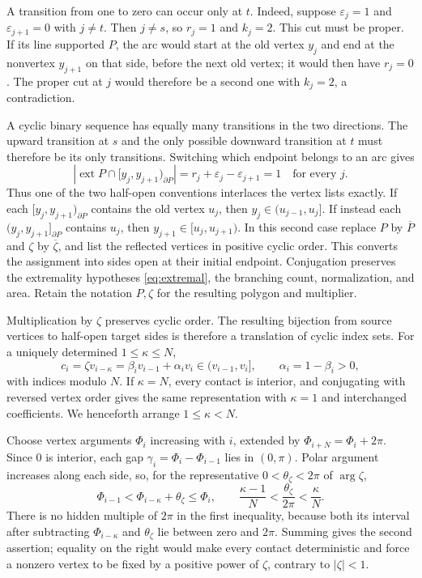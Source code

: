 \documentclass[11pt,a4paper]{article}
\DeclareMathOperator{\ext}{ext}
\theoremstyle{definition}
\theoremstyle{remark}
\numberwithin{equation}{section}
\begin{document}
A transition from one to zero can occur only at $t$. Indeed, suppose $\varepsilon_j=1$ and $\varepsilon_{j+1}=0$ with $j\ne t$. Then $j\ne s$, so $r_j=1$ and $k_j=2$. This cut must be proper. If its line supported $P$, the arc would start at the old vertex $y_j$ and end at the nonvertex $y_{j+1}$ on that side, before the next old vertex; it would then have $r_j=0$. The proper cut at $j$ would therefore be a second one with $k_j=2$, a contradiction.

A cyclic binary sequence has equally many transitions in the two directions. The upward transition at $s$ and the only possible downward transition at $t$ must therefore be its only transitions. Switching which endpoint belongs to an arc gives
\[
 |\ext P\cap[y_j,y_{j+1})_{\partial P}|
 =r_j+\varepsilon_j-\varepsilon_{j+1}=1
 \quad\text{for every }j.
\]
Thus one of the two half-open conventions interlaces the vertex lists exactly. If each $[y_j,y_{j+1})_{\partial P}$ contains the old vertex $u_j$, then $y_j\in(u_{j-1},u_j]$. If instead each $(y_j,y_{j+1}]_{\partial P}$ contains $u_j$, then $y_{j+1}\in[u_j,u_{j+1})$. In this second case replace $P$ by $\overline P$ and $\zeta$ by $\overline\zeta$, and list the reflected vertices in positive cyclic order. This converts the assignment into sides open at their initial endpoint. Conjugation preserves the extremality hypotheses \eqref{eq:extremal}, the branching count, normalization, and area. Retain the notation $P,\zeta$ for the resulting polygon and multiplier.

Multiplication by $\zeta$ preserves cyclic order. The resulting bijection from source vertices to half-open target sides is therefore a translation of cyclic index sets. For a uniquely determined $1\le\kappa\le N$,
\begin{equation}\label{eq:contacts}
 c_i=\zeta v_{i-\kappa}
 =\beta_i v_{i-1}+\alpha_i v_i\in(v_{i-1},v_i],
 \qquad \alpha_i=1-\beta_i>0,
\end{equation}
with indices modulo $N$. If $\kappa=N$, every contact is interior, and conjugating with reversed vertex order gives the same representation with $\kappa=1$ and interchanged coefficients. We henceforth arrange $1\le\kappa<N$.

Choose vertex arguments $\Phi_i$ increasing with $i$, extended by $\Phi_{i+N}=\Phi_i+2\pi$. Since $0$ is interior, each gap $\gamma_i=\Phi_i-\Phi_{i-1}$ lies in $(0,\pi)$. Polar argument increases along each side, so, for the representative $0<\theta_\zeta<2\pi$ of $\arg\zeta$,
\begin{equation}\label{eq:lift}
 \Phi_{i-1}<\Phi_{i-\kappa}+\theta_\zeta\le\Phi_i,
 \qquad \frac{\kappa-1}{N}<\frac{\theta_\zeta}{2\pi}<\frac\kappa N.
\end{equation}
There is no hidden multiple of $2\pi$ in the first inequality, because both its interval after subtracting $\Phi_{i-\kappa}$ and $\theta_\zeta$ lie between zero and $2\pi$. Summing gives the second assertion; equality on the right would make every contact deterministic and force a nonzero vertex to be fixed by a positive power of $\zeta$, contrary to $|\zeta|<1$.
\end{document}
